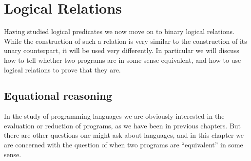 \chapter[Logical relations][Logical relations]{Logical Relations}\label{chap:logical-relations}

Having studied logical predicates we now move on to binary logical relations. While the construction of such a relation is very similar to the construction of its unary counterpart, it will be used very differently. In particular we will discuss how to tell whether two programs are in some sense equivalent, and how to use logical relations to prove that they are.


\section{Equational reasoning}

In the study of programming languages we are obviously interested in the evaluation or reduction of programs, as we have been in previous chapters. But there are other questions one might ask about languages, and in this chapter we are concerned with the question of when two programs are \enquote{equivalent} in some sense.

